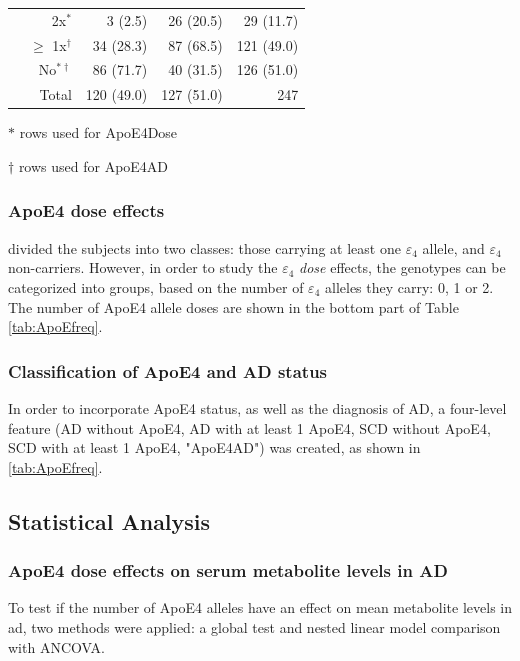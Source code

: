 \documentclass{amsart}
\begin{document}
\begin{table}
\begin{threeparttable}
\begin{tabular}{crrrr}
                                        & 2x$^\ast$            & 3 (2.5)    & 26 (20.5)  & 29 (11.7)   \\
                                        & $\geq$ 1x$ ^\dagger$ & 34 (28.3)  & 87 (68.5)  & 121 (49.0)  \\
                                        & No$^{\ast\dagger}$     & 86 (71.7)  & 40 (31.5)  & 126 (51.0)  \\ \midrule
    \multicolumn{2}{r}{Total}                                                & 120 (49.0)       & 127 (51.0)       & 247         \\ \bottomrule
  \end{tabular}
  \begin{tablenotes}
    \item[$\ast$] rows used for ApoE4Dose
    \item[$\dagger$] rows used for ApoE4AD 
  \end{tablenotes}
\end{threeparttable}
\end{table}

\subsubsection{ApoE4 dose effects}
\citeauthor{deLeeuw2017Blood-basedDisease} divided the subjects into two classes: those carrying at least one $\varepsilon_4$ allele, and $\varepsilon_4$ non-carriers. However, in order to study the $\varepsilon_4$ \textit{dose} effects, the genotypes can be categorized into groups, based on the number of $\varepsilon_4$ alleles they carry: 0, 1 or 2. The number of ApoE4 allele doses are shown in the bottom part of Table \ref{tab:ApoEfreq}.

\subsubsection{Classification of ApoE4 and AD status}
In order to incorporate ApoE4 status, as well as the diagnosis of AD, a four-level feature (AD without ApoE4, AD with at least 1 ApoE4, SCD without ApoE4, SCD with at least 1 ApoE4, "ApoE4AD") was created, as shown in \ref{tab:ApoEfreq}.

\subsection{Statistical Analysis} \label{stats}
\subsubsection{ApoE4 dose effects on serum metabolite levels in AD} \label{rq1}
To test if the number of ApoE4 alleles have an effect on mean metabolite levels in \acrshort{ad}, two methods were applied: a global test and nested linear model comparison with ANCOVA.
\end{document}
